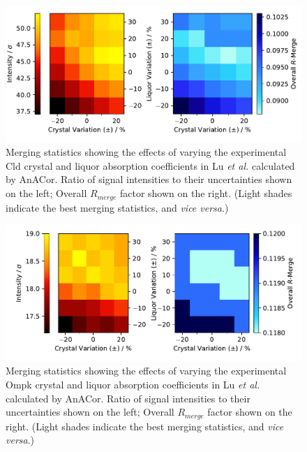 \begin{figure}[h]
    \centering
    \includegraphics[width = \textwidth]{plots/exp0/cld_merged_stats.pdf} 
    \caption{Merging statistics showing the effects of varying the experimental Cld crystal and liquor absorption coefficients in Lu \textit{et al.} \cite{Lu2024} calculated by AnACor. Ratio of signal intensities to their uncertainties shown on the left; Overall $R_{merge}$ factor shown on the right. (Light shades indicate the best merging statistics, and \textit{vice versa}.)}
    \label{fig:cld_stats}
\end{figure}

\begin{figure}[h]
    \centering
    \includegraphics[width = \textwidth]{plots/exp0/ompk_merged_stats.pdf}
    \caption{Merging statistics showing the effects of varying the experimental Ompk crystal and liquor absorption coefficients in Lu \textit{et al.} \cite{Lu2024} calculated by AnACor. Ratio of signal intensities to their uncertainties shown on the left; Overall $R_{merge}$ factor shown on the right. (Light shades indicate the best merging statistics, and \textit{vice versa}.)}
    \label{fig:ompk_stats}
\end{figure}



